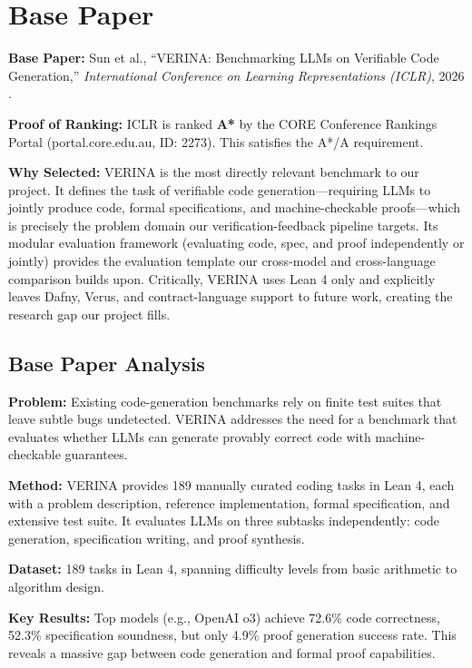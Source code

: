 \documentclass[11pt,a4paper]{article}
\begin{document}
\section{Base Paper}

\textbf{Base Paper:} Sun et al., ``VERINA: Benchmarking LLMs on Verifiable Code Generation,'' \textit{International Conference on Learning Representations (ICLR)}, 2026 \cite{verina2026}.

\textbf{Proof of Ranking:} ICLR is ranked \textbf{A*} by the CORE Conference Rankings Portal (portal.core.edu.au, ID: 2273). This satisfies the A*/A requirement.

\textbf{Why Selected:} VERINA is the most directly relevant benchmark to our project. It defines the task of verifiable code generation---requiring LLMs to jointly produce code, formal specifications, and machine-checkable proofs---which is precisely the problem domain our verification-feedback pipeline targets. Its modular evaluation framework (evaluating code, spec, and proof independently or jointly) provides the evaluation template our cross-model and cross-language comparison builds upon. Critically, VERINA uses Lean 4 only and explicitly leaves Dafny, Verus, and contract-language support to future work, creating the research gap our project fills.

\subsection{Base Paper Analysis}

\textbf{Problem:} Existing code-generation benchmarks rely on finite test suites that leave subtle bugs undetected. VERINA addresses the need for a benchmark that evaluates whether LLMs can generate provably correct code with machine-checkable guarantees.

\textbf{Method:} VERINA provides 189 manually curated coding tasks in Lean 4, each with a problem description, reference implementation, formal specification, and extensive test suite. It evaluates LLMs on three subtasks independently: code generation, specification writing, and proof synthesis.

\textbf{Dataset:} 189 tasks in Lean 4, spanning difficulty levels from basic arithmetic to algorithm design.

\textbf{Key Results:} Top models (e.g., OpenAI o3) achieve 72.6\% code correctness, 52.3\% specification soundness, but only 4.9\% proof generation success rate. This reveals a massive gap between code generation and formal proof capabilities.
\end{document}
